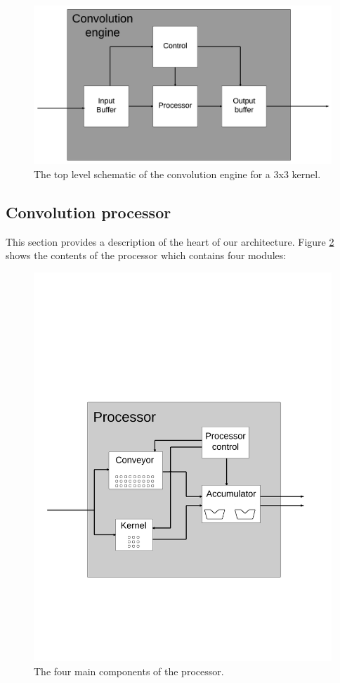 \begin{figure}[h!]
    \includegraphics[width=\linewidth]{img/convolution_engine.png}
    \caption{The top level schematic of the convolution engine for a 3x3 kernel.}
    \label{fig:conv_engine}
\end{figure}

\subsection{Convolution processor}
This section provides a description of the heart of our architecture.
Figure \ref{fig:convolution_processor} shows the contents of the processor which contains four modules:

\begin{figure}[h!]
    \includegraphics[width=\linewidth]{img/processor.png}
    \caption{The four main components of the processor.}
    \label{fig:convolution_processor}
\end{figure}

